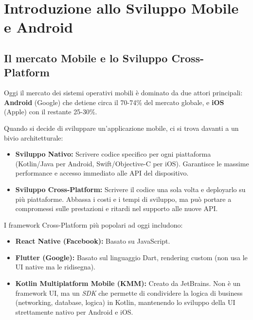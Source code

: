 \chapter{Introduzione allo Sviluppo Mobile e Android}

\section{Il mercato Mobile e lo Sviluppo Cross-Platform}
Oggi il mercato dei sistemi operativi mobili è dominato da due attori principali: \textbf{Android} (Google) che detiene circa il 70-74\% del mercato globale, e \textbf{iOS} (Apple) con il restante 25-30\%.

Quando si decide di sviluppare un'applicazione mobile, ci si trova davanti a un bivio architetturale:
\begin{itemize}
    \item \textbf{Sviluppo Nativo:} Scrivere codice specifico per ogni piattaforma (Kotlin/Java per Android, Swift/Objective-C per iOS).
    Garantisce le massime performance e accesso immediato alle API del dispositivo.
    \item \textbf{Sviluppo Cross-Platform:} Scrivere il codice una sola volta e deployarlo su più piattaforme.
    Abbassa i costi e i tempi di sviluppo, ma può portare a compromessi sulle prestazioni e ritardi nel supporto alle nuove API\@.
\end{itemize}

I framework Cross-Platform più popolari ad oggi includono:
\begin{itemize}
    \item \textbf{React Native (Facebook):} Basato su JavaScript.
    \item \textbf{Flutter (Google):} Basato sul linguaggio Dart, rendering custom (non usa le UI native ma le ridisegna).
    \item \textbf{Kotlin Multiplatform Mobile (KMM):} Creato da JetBrains.
    Non è un framework UI, ma un \textit{SDK} che permette di condividere la logica di business (networking, database, logica)
    in Kotlin, mantenendo lo sviluppo della UI strettamente nativo per Android e iOS.
\end{itemize}

